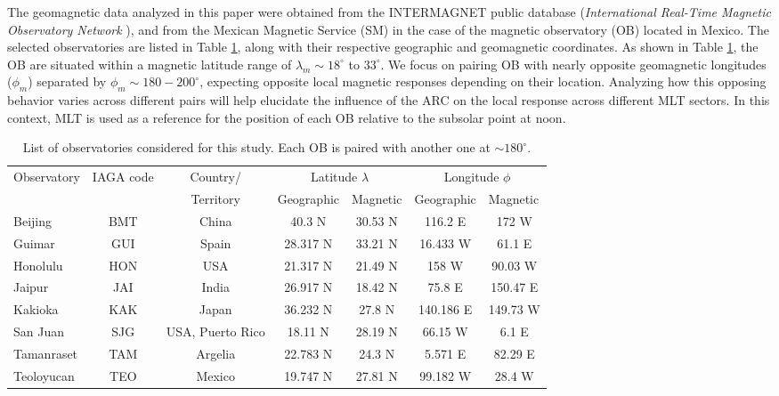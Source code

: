 \documentclass[a4paper]{article}
\theoremstyle{plain}
\theoremstyle{definition}
\begin{document}
	The geomagnetic data analyzed in this paper were obtained from the INTERMAGNET public database (\textit{International Real-Time Magnetic Observatory Network} \citep{intermagnet}), and from the Mexican Magnetic Service (SM) in the case of the magnetic observatory (OB) located in Mexico. The selected observatories are listed in Table \ref{tab:obs}, along with their respective geographic and geomagnetic coordinates. As shown in Table \ref{tab:obs}, the OB are situated within a magnetic latitude range of $\lambda_m \sim 18^\circ$ to $33^\circ$. We focus on pairing OB with nearly opposite geomagnetic longitudes ($\phi_m$) separated by $\phi_m \sim 180-200^\circ$, expecting opposite local magnetic responses depending on their location. Analyzing how this opposing behavior varies across different pairs will help elucidate the influence of the ARC on the local response across different MLT sectors. In this context, MLT is used as a reference for the position of each OB relative to the subsolar point at noon.\\ 
	
	
	\begin{table}[htbp]
		\centering
		\caption{List of observatories considered for this study. Each OB is paired with another one at $\sim 180^\circ$.}
		\begin{tabular}{lcccccc}
			\hline
			\multicolumn{1}{l}{Observatory} & \multicolumn{1}{l}{IAGA code} & Country/ & \multicolumn{2}{c}{Latitude $\lambda$} & \multicolumn{2}{c}{Longitude $\phi$}  \\ 
			\multicolumn{1}{l}{} & \multicolumn{1}{l}{} & Territory & \multicolumn{1}{l}{Geographic} & \multicolumn{1}{l}{Magnetic} & \multicolumn{1}{l}{Geographic} & \multicolumn{1}{l}{Magnetic}  \\ \hline
					Beijing & BMT & China & 40.3 N & 30.53 N & 116.2 E & 172 W  \\ 
			Guimar & GUI & Spain & 28.317 N & 33.21 N & 16.433 W & 61.1 E  \\ 
					Honolulu & HON & USA & 21.317 N & 21.49 N & 158 W & 90.03 W \\ 
			Jaipur & JAI & India & 26.917 N & 18.42 N & 75.8 E & 150.47 E \\
			Kakioka & KAK & Japan & 36.232 N & 27.8 N & 140.186 E & 149.73 W \\  
					San Juan & SJG & USA, Puerto Rico & 18.11 N & 28.19 N & 66.15 W & 6.1 E \\ 
					Tamanraset & TAM & Argelia & 22.783 N & 24.3 N & 5.571 E & 82.29 E  \\
			Teoloyucan & TEO & Mexico & 19.747 N & 27.81 N & 99.182 W & 28.4 W \\ \hline
		\end{tabular}
		\label{tab:obs}
	\end{table}
	
\end{document}
